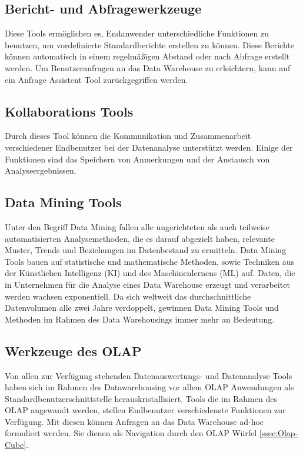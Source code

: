 \subsection{Bericht- und Abfragewerkzeuge}\label{ssec:Bericht-Werkzeug}
Diese Tools ermöglichen es, Endanwender unterschiedliche Funktionen zu benutzen, um vordefinierte Standardberichte erstellen zu können. Diese Berichte können automatisch in einem regelmäßigen Abstand oder nach Abfrage erstellt werden. Um Benutzeranfragen an das Data Warehouse zu erleichtern, kann auf ein Anfrage Assistent Tool zurückgegriffen werden.
\subsection{Kollaborations Tools}\label{ssec:Kollab-Werkzeug}
Durch dieses Tool können die Kommunikation und Zusammenarbeit verschiedener Endbenutzer bei der Datenanalyse unterstützt werden. Einige der Funktionen sind das Speichern von Anmerkungen und der Austausch von Analyseergebnissen.
\subsection{Data Mining Tools}\label{ssec:Data-Minging}
Unter den Begriff Data Mining fallen alle ungerichteten als auch teilweise automatisierten Analysemethoden, die es darauf abgezielt haben, relevante Muster, Trends und Beziehungen im Datenbestand zu ermitteln. Data Mining Tools bauen auf statistische und mathematische Methoden, sowie Techniken aus der Künstlichen Intelligenz (KI) und des Maschinenlernens (ML) auf. Daten, die in Unternehmen für die Analyse eines Data Warehouse erzeugt und verarbeitet werden wachsen exponentiell. Da sich weltweit das durchschnittliche Datenvolumen alle zwei Jahre verdoppelt, gewinnen Data Mining Tools und Methoden im Rahmen des Data Warehousings immer mehr an Bedeutung.
\subsection{Werkzeuge des OLAP}\label{ssec:Werkzeuge-OLAP}
Von allen zur Verfügung stehenden Datenauswertungs- und Datenanalyse Tools haben sich im Rahmen des Datawarehousing vor allem OLAP Anwendungen als Standardbenutzerschnittstelle herauskristallisiert. Tools die im Rahmen des OLAP angewandt werden, stellen Endbenutzer verschiedenste Funktionen zur Verfügung. Mit diesen können Anfragen an das Data Warehouse ad-hoc formuliert werden. Sie dienen als Navigation durch den OLAP Würfel \ref{ssec:Olap-Cube}. 

